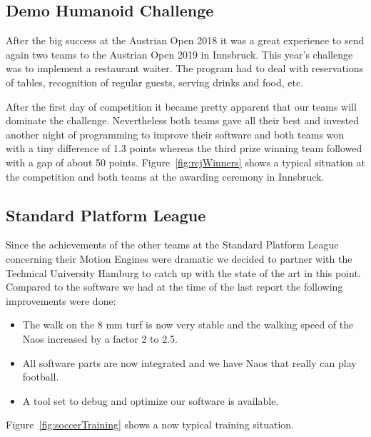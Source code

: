 \documentclass[11pt]{article}
\begin{document}
\subsection{Demo Humanoid Challenge}\label{sec:demoHumanoidChallenge}
After the big success at the Austrian Open 2018 it was a great experience to send again two teams to the Austrian Open 2019 in Innsbruck. This year's challenge was to implement a restaurant waiter. The program had to deal with reservations of tables, recognition of regular guests, serving drinks and food, etc.

After the first day of competition it became pretty apparent that our teams will dominate the challenge. Nevertheless both teams gave all their best and invested another night of programming to improve their software and both teams won with a tiny difference of 1.3 points whereas the third prize winning team followed with a gap of about 50 points. Figure~\ref{fig:rcjWinners} shows a typical situation at the competition and both teams at the awarding ceremony in Innsbruck.

\subsection{Standard Platform League}\label{sec:spl}
Since the achievements of the other teams at the Standard Platform League concerning their Motion Engines were dramatic we decided to partner with the Technical University Hamburg to catch up with the state of the art in this point. Compared to the software we had at the time of the last report the following improvements were done:

\begin{itemize}
	\item The walk on the 8 mm turf is now very stable and the walking speed of the Naos increased by a factor 2 to 2.5. 
	\item All software parts are now integrated and we have Naos that really can play football.
	\item A tool set to debug and optimize our software is available.
\end{itemize}
Figure~\ref{fig:soccerTraining} shows a now typical training situation.
\end{document}

